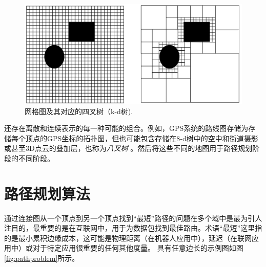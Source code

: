 \begin{figure}
\centering
\includegraphics[width=\textwidth]{figs/gridvskdtree.png}
\caption{网格图及其对应的四叉树（k-d树).}
\label{fig:gridvskdtree}
\end{figure}



还存在离散和连续表示的每一种可能的组合。例如，GPS系统的路线图存储为存储每个顶点的GPS坐标的拓扑图，但也可能包含存储在8-d树中的空中和街道摄影或甚至3D点云的叠加层，也称为\emph{八叉树} 。然后将这些不同的地图用于路径规划阶段的不同阶段。



\section{路径规划算法}
通过连接图从一个顶点到另一个顶点找到“最短”路径的问题在多个域中是最为引人注目的，最重要的是在互联网中，用于为数据包找到最佳路由。术语“最短”这里指的是最小累积边缘成本，这可能是物理距离（在机器人应用中），延迟（在联网应用中）或对于特定应用很重要的任何其他度量。 具有任意边长的示例图如图\ref{fig:pathproblem}所示。

